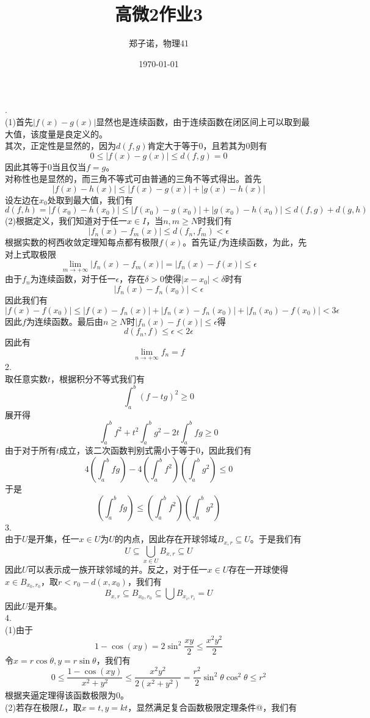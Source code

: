 \documentclass[utf8]{ctexart}
\title{高微2作业3}
\author{郑子诺，物理41}
\date{\today}
\makeatletter
\newcommand{\Rmnum}[1]{\expandafter\@slowromancap\romannumeral #1@}
\makeatother
\begin{document}
\maketitle
{}.\\
(1)首先$|f(x)-g(x)|$显然也是连续函数，由于连续函数在闭区间上可以取到最大值，该度量是良定义的。\\
其次，正定性是显然的，因为$d(f,g)$肯定大于等于$0$，且若其为$0$则有
\[0\le|f(x)-g(x)|\le d(f,g)=0\]
因此其等于$0$当且仅当$f=g$。\\
对称性也是显然的，而三角不等式可由普通的三角不等式得出。首先
\[|f(x)-h(x)|\le|f(x)-g(x)|+|g(x)-h(x)|\]
设左边在$x_0$处取到最大值，我们有
\[d(f,h)=|f(x_0)-h(x_0)|\le|f(x_0)-g(x_0)|+|g(x_0)-h(x_0)|\le d(f,g)+d(g,h)\]
(2)根据定义，我们知道对于任一$x\in I$，当$n,m\ge N$时我们有
\[|f_n(x)-f_m(x)|\le d(f_n,f_m)<\epsilon\]
根据实数的柯西收敛定理知每点都有极限$f(x)$。首先证$f$为连续函数，为此，先对上式取极限
\[\lim_{m\rightarrow+\infty}|f_n(x)-f_m(x)|=|f_n(x)-f(x)|\le\epsilon\]
由于$f_n$为连续函数，对于任一$\epsilon$，存在$\delta>0$使得$|x-x_0|<\delta$时有
\[|f_n(x)-f_n(x_0)|<\epsilon\]
因此我们有
\[|f(x)-f(x_0)|\le |f(x)-f_n(x)|+|f_n(x)-f_n(x_0)|+|f_n(x_0)-f(x_0)|<3\epsilon\]
因此$f$为连续函数。最后由$n\ge N$时$|f_n(x)-f(x)|\le\epsilon$得
\[d(f_n,f)\le\epsilon<2\epsilon\]
因此有
\[\lim_{n\rightarrow+\infty}f_n=f\]
2.\\
取任意实数$t$，根据积分不等式我们有
\[\int_{a}^{b}(f-tg)^2\ge0\]
展开得
\[\int_{a}^{b}f^2+t^2\int_{a}^{b}g^2-2t\int_{a}^{b}fg\ge0\]
由于对于所有$t$成立，该二次函数判别式需小于等于$0$，因此我们有
\[4\left(\int_{a}^{b}fg\right)-4\left(\int_{a}^{b}f^2\right)\left(\int_{a}^{b}g^2\right)\le0\]
于是
\[\left(\int_{a}^{b}fg\right)\le\left(\int_{a}^{b}f^2\right)\left(\int_{a}^{b}g^2\right)\]
3.\\
由于$U$是开集，任一$x\in U$为$U$的内点，因此存在开球邻域$B_{x,r}\subseteq U$。于是我们有
\[U\subseteq\bigcup_{x\in U}B_{x,r}\subseteq U\]
因此$U$可以表示成一族开球邻域的并。反之，对于任一$x\in U$存在一开球使得$x\in B_{x_0,r_0}$，取$r<r_0-d(x,x_0)$，我们有
\[B_{x,r}\subseteq B_{x_0,r_0}\subseteq\bigcup B_{x_i,r_i}=U\]
因此$U$是开集。\\
4.\\
(1)由于
\[1-\cos(xy)=2\sin^2\frac{xy}{2}\le\frac{x^2y^2}{2}\]
令$x=r\cos\theta,y=r\sin\theta$，我们有
\[0\le\frac{1-\cos(xy)}{x^2+y^2}\le\frac{x^2y^2}{2(x^2+y^2)}=\frac{r^2}{2}\sin^2\theta\cos^2\theta\le r^2\]
根据夹逼定理得该函数极限为$0$。\\
(2)若存在极限$L$，取$x=t,y=kt$，显然满足复合函数极限定理条件\Rmnum{1}，我们有
\end{document}
